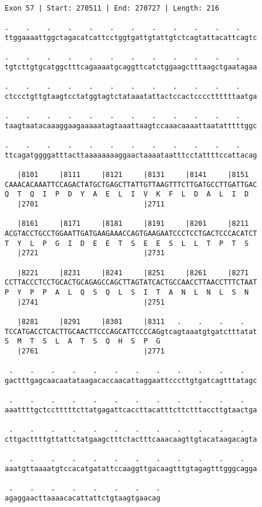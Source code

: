 \documentclass{article}
\begin{document}
\begin{Verbatim}
Exon 57 | Start: 270511 | End: 270727 | Length: 216
 
.    .    .    .    .    .    .    .    .    .    .    .    
ttggaaaattggctagacatcattcctggtgattgtattgtctcagtattacattcagtc
  
.    .    .    .    .    .    .    .    .    .    .    .    
tgtcttgtgcatggctttcagaaaatgcaggttcatctggaagctttaagctgaatagaa
  
.    .    .    .    .    .    .    .    .    .    .    .    
ctccctgttgtaagtcctatggtagtctataaatattactccactccccttttttaatga
  
.    .    .    .    .    .    .    .    .    .    .    .    
taagtaatacaaaggaagaaaaatagtaaattaagtccaaacaaaattaatatttttggc
  
.    .    .    .    .    .    .    .    .    .    .    .    
ttcagatggggatttacttaaaaaaaaggaactaaaataatttcctattttccattacag
  
   |8101     |8111     |8121     |8131     |8141     |8151  
CAAACACAAATTCCAGACTATGCTGAGCTTATTGTTAAGTTTCTTGATGCCTTGATTGAC
Q  T  Q  I  P  D  Y  A  E  L  I  V  K  F  L  D  A  L  I  D  
   |2701                         |2711                      
  
   |8161     |8171     |8181     |8191     |8201     |8211  
ACGTACCTGCCTGGAATTGATGAAGAAACCAGTGAAGAATCCCTCCTGACTCCCACATCT
T  Y  L  P  G  I  D  E  E  T  S  E  E  S  L  L  T  P  T  S  
   |2721                         |2731                      
  
   |8221     |8231     |8241     |8251     |8261     |8271  
CCTTACCCTCCTGCACTGCAGAGCCAGCTTAGTATCACTGCCAACCTTAACCTTTCTAAT
P  Y  P  P  A  L  Q  S  Q  L  S  I  T  A  N  L  N  L  S  N  
   |2741                         |2751                      
  
   |8281     |8291     |8301     |8311   .    .    .    .   
TCCATGACCTCACTTGCAACTTCCCAGCATTCCCCAGgtcagtaaatgtgatctttatat
S  M  T  S  L  A  T  S  Q  H  S  P  G                       
   |2761                         |2771                      
  
 .    .    .    .    .    .    .    .    .    .    .    .   
gactttgagcaacaatataagacaccaacattaggaattcccttgtgatcagtttatagc
  
 .    .    .    .    .    .    .    .    .    .    .    .   
aaattttgctcctttttcttatgagattcaccttacatttcttctttaccttgtaactga
  
 .    .    .    .    .    .    .    .    .    .    .    .   
cttgacttttgttattctatgaagctttctactttcaaacaagttgtacataagacagta
  
 .    .    .    .    .    .    .    .    .    .    .    .   
aaatgttaaaatgtccacatgatattccaaggttgacaagtttgtagagtttgggcagga
  
 .    .    .    .    .    .    .    .
agaggaacttaaaacacattattctgtaagtgaacag
\end{Verbatim}
\end{document}
